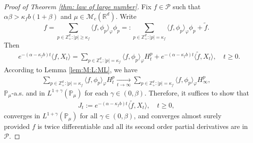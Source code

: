 \documentclass[12pt,a4paper]{amsart}
\theoremstyle{plain}
\theoremstyle{definition}
\numberwithin{equation}{section}
\begin{document}
\begin{proof}[Proof of Theorem \ref{thm: law of large number}]
	Fix $f \in \mathcal P$ such that $\alpha \beta > \kappa_f b (1+\beta)$ and $\mu \in \mathcal M_c(\mathbb R^d)$.
	Write
  \[  
    f
    = \sum_{p\in \mathbb Z_+^d:|p|\geq \kappa_f}\langle f,\phi_p\rangle_\varphi \phi_p
    =: \sum_{p\in \mathbb Z_+^d:|p|= \kappa_f}\langle f,\phi_p\rangle_\varphi \phi_p+\widetilde{f}.
  \]
	Then
  \begin{align}
    & e^{-(\alpha-\kappa_fb)t}\langle f,X_t\rangle=
      \sum_{p\in \mathbb Z_+^d:|p|= \kappa_f}\langle f,\phi_p\rangle_\varphi H_t^p+e^{-(\alpha-\kappa_fb)t} \langle \widetilde{f},X_t\rangle,
      \quad t\geq 0.
  \end{align}
	According to Lemma \ref{lem:M:L:ML}, we have
  \begin{align}
    \label{as convergence}
    \sum_{p\in \mathbb{Z}_+^d:|p|= \kappa_f}\langle f,\phi_p\rangle_\varphi H_t^p
    \xrightarrow[t\to \infty]{} \sum_{p\in \mathbb{Z}_+^d:|p|=\kappa_f}\langle f, \phi_p\rangle_{\varphi} H_{\infty}^p,
  \end{align}
  $\mathbb{P}_{\mu}$-a.s. and in $L^{1+\gamma}(\mathbb{P}_{\mu})$ for each $\gamma\in(0,\beta)$.
  Therefore, it suffices to show that
  \begin{align}
    J_t
    :=e^{-(\alpha-\kappa_fb)t}\langle \widetilde{f},X_t\rangle,
    \quad t\geq 0,
  \end{align}
  converges in $L^{1+\gamma}(\mathbb{P}_{\mu})$ for all $\gamma\in(0,\beta)$, and converges almost surely provided $f$ is twice differentiable and all its second order partial derivatives are in $\mathcal{P}$.


\end{proof}
\end{document}
